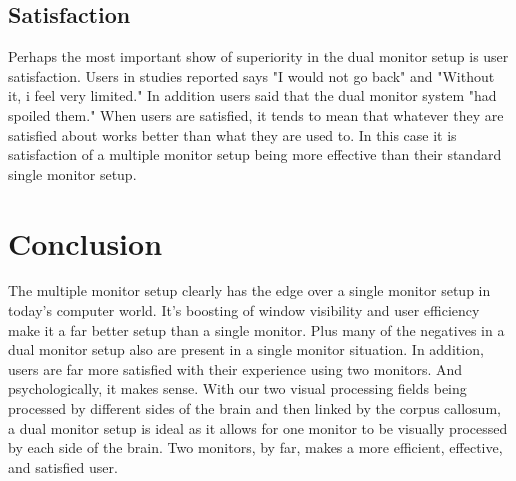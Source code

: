 \documentclass[a4paper]{article}
\begin{document}
\subsection{Satisfaction}
Perhaps the most important show of superiority in the dual monitor setup is user satisfaction. Users in studies reported says "I would not go back" and "Without it, i feel very limited."\cite{Grudin} In addition users said that the dual monitor system "had spoiled them."\cite{Grudin} When users are satisfied, it tends to mean that whatever they are satisfied about works better than what they are used to. In this case it is satisfaction of a multiple monitor setup being more effective than their standard single monitor setup.

\section{Conclusion}
The multiple monitor setup clearly has the edge over a single monitor setup in today's computer world. It's boosting of window visibility and user efficiency make it a far better setup than a single monitor. Plus many of the negatives in a dual monitor setup also are present in a single monitor situation. In addition, users are far more satisfied with their experience using two monitors. And psychologically, it makes sense. With our two visual processing fields being processed by different sides of the brain and then linked by the corpus callosum, a dual monitor setup is ideal as it allows for one monitor to be visually processed by each side of the brain. Two monitors, by far, makes a more efficient, effective, and satisfied user.



\end{document}
